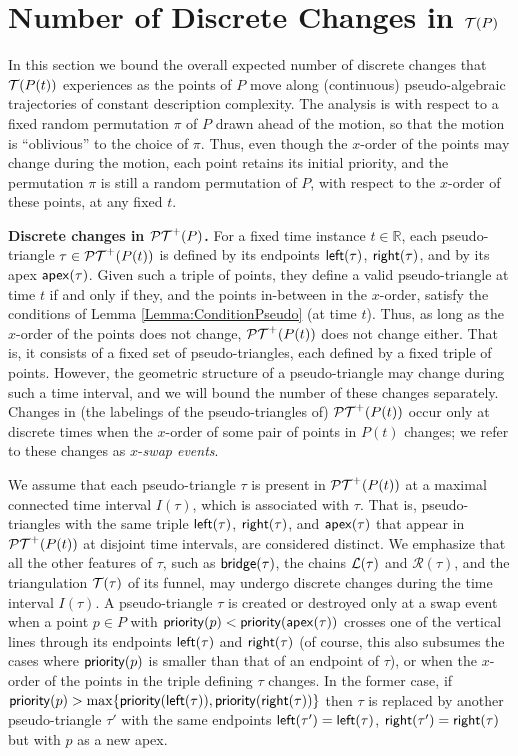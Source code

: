 \documentclass[11pt]{article}
\def\bridge{{\sf bridge}}
\def\PT{{\cal PT}}
\def\T{{\cal T}}
\def\prior{{\sf priority}}
\def\reals{{\mathbb R}}
\def\L{{\cal L}}
\def\R{\mathcal{R}}
\def\Left{{\sf left}}
\def\Right{{\sf right}}
\def\apex{{\sf apex}}
\begin{document}
\section{Number of Discrete Changes in $\T(P)$}\label{Sec:CombiChanges}
In this section we bound the overall expected number of discrete changes that $\T(P(t))$ experiences as the points of $P$ move along (continuous) pseudo-algebraic trajectories of constant description complexity.
The analysis is with respect to a fixed random permutation $\pi$ of $P$ drawn ahead of the motion, so that the motion is ``oblivious'' to the choice of $\pi$. Thus, even though the $x$-order of the points may change during the motion, each point retains its initial priority, and the permutation $\pi$ is still a random permutation of $P$, with respect to the $x$-order of these points, at any fixed $t$.

\medskip
\noindent
{\bf Discrete changes in $\PT^+(P)$.}
For a fixed time instance $t\in \reals$, each pseudo-triangle $\tau\in
\PT^+(P(t))$ is defined by its endpoints 
$\Left(\tau)$, $\Right(\tau)$, and by its apex $\apex(\tau)$. 
Given such a triple of points, they define a
valid pseudo-triangle at time $t$ if and only if they, and the points
in-between in the $x$-order, satisfy the conditions of Lemma
\ref{Lemma:ConditionPseudo} (at time $t$).  Thus, as long as the
$x$-order of the points does not change, $\PT^+(P(t))$ does not change
either. That is, it consists of a fixed set of pseudo-triangles, each
defined by a fixed triple of points. However, the geometric structure of
a pseudo-triangle may change during such a time interval, and we will bound the number of these changes separately. Changes in (the labelings of the pseudo-triangles of) $\PT^+(P(t))$ occur only at discrete times when the
$x$-order of some pair of points in $P(t)$ changes; we refer to these
changes as $x$-\textit{swap events}.  

We assume that each
pseudo-triangle $\tau$ is present in $\PT^+(P(t))$ at a maximal connected time
interval $I(\tau)$, which is associated with $\tau$.  That is,
pseudo-triangles with the same triple $\Left(\tau)$, $\Right(\tau)$, and 
 $\apex(\tau)$  that appear in $\PT^+(P(t))$ at
disjoint time intervals, are considered distinct.  We emphasize that
all the other features of $\tau$, such as $\bridge(\tau)$, the
chains $\L(\tau)$ and $\R(\tau)$, and the triangulation $\T(\tau)$ of its funnel, may undergo discrete changes during
the time interval $I(\tau)$.  A pseudo-triangle $\tau$ is created or
destroyed only at a swap event when a point $p\in P$ with
$\prior(p)<\prior(\apex(\tau))$ crosses one of the vertical lines
through its endpoints $\Left(\tau)$ and $\Right(\tau)$ (of course, this also subsumes the cases where $\prior(p)$ is smaller than that of an endpoint of $\tau$), or when the
$x$-order of the points in the triple defining $\tau$ changes. In the
former case, if $\prior(p)>\max
\{\prior(\Left(\tau)),\prior(\Right(\tau))\}$ then $\tau$ is replaced
by another pseudo-triangle $\tau'$ with the same endpoints
$\Left(\tau')=\Left(\tau)$, $\Right(\tau')=\Right(\tau)$ but with $p$
as a new apex.
\end{document}
